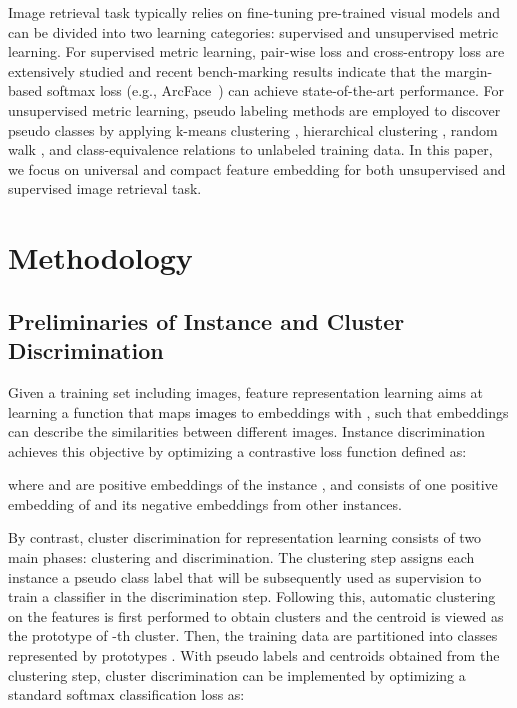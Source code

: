 \documentclass{article} \usepackage{iclr2023_conference,times}
\begin{document}
 Image retrieval task typically relies on fine-tuning pre-trained visual models \citep{szegedy2015going,he2016deep,dosovitskiy2021image} and can be divided into two learning categories: supervised and unsupervised metric learning. For supervised metric learning, pair-wise loss \citep{hadsell2006dimensionality,schroff2015facenet,sohn2016improved} and cross-entropy loss \citep{zhai2018classification,deng2019arcface,sun2020circle,qian2019softtriple} are extensively studied and recent bench-marking results \citep{musgrave2020metric} indicate that the margin-based softmax loss (e.g., ArcFace~\citep{deng2019arcface}) can achieve state-of-the-art performance. For unsupervised metric learning, pseudo labeling methods are employed to discover pseudo classes by applying k-means clustering \citep{kan2021relative,li2020unsupervised}, hierarchical clustering \citep{yan2021unsupervised}, random walk \citep{iscen2018mining}, and class-equivalence relations \citep{Kim2022CVPR} to unlabeled training data. 
In this paper, we focus on universal and compact feature embedding for both unsupervised and supervised image retrieval task.


\section{Methodology}
\subsection{Preliminaries of Instance and Cluster Discrimination}
Given a training set  including  images,
feature representation learning aims at learning a function  that maps \textcolor{black}{images } to embeddings  with , such that embeddings can describe the similarities between different images. 
Instance discrimination achieves this objective by optimizing a contrastive loss function defined as:
\vspace{-2mm}

where  and  are positive embeddings of the instance , and  consists of one positive embedding of  and its  negative embeddings from other instances.

By contrast, cluster discrimination for representation learning consists of two main phases: clustering and discrimination. 
The clustering step assigns each instance a pseudo class label that will be subsequently used as supervision to train a classifier in the discrimination step. 
Following this, automatic clustering on the features  is first performed 
to obtain  clusters and the centroid  is viewed as the prototype of -th cluster. 
Then, the training data  are  partitioned into  classes represented by prototypes . 
With pseudo labels and centroids obtained from the clustering step, cluster discrimination can be implemented by optimizing a standard softmax classification loss as:
\vspace{-2mm}
\end{document}
